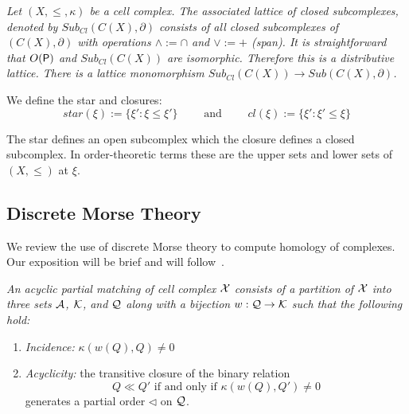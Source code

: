\begin{ex}
{\em
Let $(X,\leq,\kappa)$ be a cell complex.  The associated {\em lattice of closed subcomplexes}, denoted by $Sub_{Cl}(C(X),\partial)$ consists of all closed subcomplexes of $(C(X),\partial)$ with operations $\wedge:= \cap$ and $\vee := +$ (span).  It is straightforward that $O({\mathsf P})$ and $Sub_{Cl}(C(X))$ are isomorphic.  Therefore this is a distributive lattice.  There is a lattice monomorphism $Sub_{Cl}(C(X))\to Sub(C(X),\partial)$.
}
\end{ex}

We define the star and closures: 
\[
star(\xi):= \{\xi': \xi \leq \xi'\}\quad\quad \text{ and } \quad\quad cl(\xi) := \{\xi':\xi'\leq \xi\}
\]

The star defines an open subcomplex which the closure defines a closed subcomplex.  In order-theoretic terms these are the upper sets and lower sets of $(X,\leq)$ at $\xi$.





\subsection{Discrete Morse Theory}
We review the use of discrete Morse theory to compute homology of complexes. Our exposition will be brief and will follow~\cite{focm}.

\begin{defn}
{\em
An {\em acyclic partial matching} of cell complex ${\mathcal X}$ consists of a partition of ${\mathcal X}$ into three sets ${\mathcal A}$, ${\mathcal K}$, and ${\mathcal Q}$ along with a bijection $w:{\mathcal Q}\to {\mathcal K}$ such that the following hold:
 \begin{enumerate}
 \item {\em Incidence:} $\kappa(w(Q),Q)\neq 0$
 \item {\em Acyclicity:} the transitive closure of the binary relation $$Q \ll Q' \text{ if and only if } \kappa (w(Q),Q')\neq 0$$
 generates a partial order $\lhd$ on ${\mathcal Q}$.
 \end{enumerate}
 }
 \end{defn} 
 
